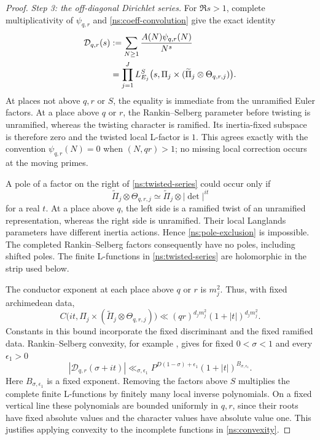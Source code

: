 \documentclass[11pt,reqno]{amsart}
\numberwithin{equation}{section}
\theoremstyle{definition}
\theoremstyle{remark}
\begin{document}
\begin{proof}
\emph{Step 3: the off-diagonal Dirichlet series.}
For $\Re s>1$, complete multiplicativity of $\psi_{q,r}$ and \eqref{ns:coeff-convolution} give the exact identity
\begin{align}
\mathcal D_{q,r}(s)
&:=\sum_{N\ge1}\frac{A(N)\psi_{q,r}(N)}{N^s}\notag\\
&=\prod_{j=1}^{J}L_{E_j}^{S}
 \bigl(s,\Pi_j\times(\widetilde\Pi_j\otimes\Theta_{q,r,j})\bigr).
\label{ns:twisted-series}
\end{align}
At places not above $q,r$ or $S$, the equality is immediate from the unramified Euler factors. At a place above $q$ or $r$, the Rankin--Selberg parameter before twisting is unramified, whereas the twisting character is ramified. Its inertia-fixed subspace is therefore zero and the twisted local L-factor is $1$. This agrees exactly with the convention $\psi_{q,r}(N)=0$ when $(N,qr)>1$; no missing local correction occurs at the moving primes.

A pole of a factor on the right of \eqref{ns:twisted-series} could occur only if
\begin{equation}\label{ns:pole-exclusion}
\widetilde\Pi_j\otimes\Theta_{q,r,j}
\simeq\widetilde\Pi_j\otimes|\det|^{it}
\end{equation}
for a real $t$. At a place above $q$, the left side is a ramified twist of an unramified representation, whereas the right side is unramified. Their local Langlands parameters have different inertia actions. Hence \eqref{ns:pole-exclusion} is impossible. The completed Rankin--Selberg factors consequently have no poles, including shifted poles. The finite L-functions in \eqref{ns:twisted-series} are holomorphic in the strip used below.

The conductor exponent at each place above $q$ or $r$ is $m_j^2$. Thus, with fixed archimedean data,
\begin{equation}\label{ns:twisted-conductor}
C\bigl(it,\Pi_j\times(\widetilde\Pi_j\otimes\Theta_{q,r,j})\bigr)
\ll (qr)^{d_jm_j^2}(1+|t|)^{d_jm_j^2}.
\end{equation}
Constants in this bound incorporate the fixed discriminant and the fixed ramified data. Rankin--Selberg convexity, for example \cite[Lemma~3.2]{HT}, gives for fixed $0<\sigma<1$ and every $\epsilon_1>0$
\begin{equation}\label{ns:convexity}
|\mathcal D_{q,r}(\sigma+it)|
\ll_{\sigma,\epsilon_1}
P^{D(1-\sigma)+\epsilon_1}(1+|t|)^{B_{\sigma,\epsilon_1}}.
\end{equation}
Here $B_{\sigma,\epsilon_1}$ is a fixed exponent. Removing the factors above $S$ multiplies the complete finite L-functions by finitely many local inverse polynomials. On a fixed vertical line these polynomials are bounded uniformly in $q,r$, since their roots have fixed absolute values and the character values have absolute value one. This justifies applying convexity to the incomplete functions in \eqref{ns:convexity}.


\end{proof}
\end{document}
